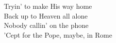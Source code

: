 Tryin' to make His way home \\
Back up to Heaven all alone \\
Nobody callin' on the phone \\
'Cept for the Pope, maybe, in Rome
